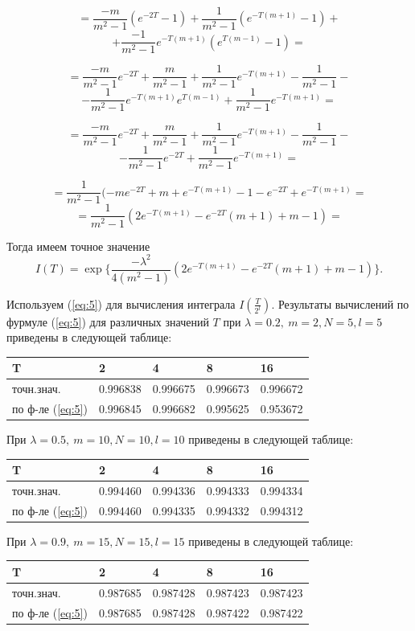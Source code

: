 \documentclass [12pt]{report}
\begin{document}
$$
= \frac{-m}{m^2-1} (e^{-2T} - 1) +
\frac{1}{m^2-1} ( e^{-T(m+1)} - 1) +
$$
$$
+ \frac{-1}{m^2-1} e^{-T(m+1)} (e^{T(m-1)} - 1) =
$$

$$
= \frac{-m}{m^2-1} e^{-2T} + \frac{m}{m^2-1} +
\frac{1}{m^2-1} e^{-T(m+1)} - \frac{1}{m^2-1} -
$$
$$
- \frac{1}{m^2-1} e^{-T(m+1)} e^{T(m-1)} + \frac{1}{m^2-1} e^{-T(m+1)} =
$$

$$
= \frac{-m}{m^2-1} e^{-2T} + \frac{m}{m^2-1} +
\frac{1}{m^2-1} e^{-T(m+1)} - \frac{1}{m^2-1} -
$$
$$
- \frac{1}{m^2-1} e^{-2T} + \frac{1}{m^2-1} e^{-T(m+1)} =
$$

$$
= \frac{1}{m^2-1}( -m e^{-2T} + m +
e^{-T(m+1)} - 1 - e^{-2T} + e^{-T(m+1)} =
$$
$$
= \frac{1}{m^2-1}( 2e^{-T(m+1)} - e^{-2T} (m + 1) + m - 1) =
$$

\noindent Тогда имеем точное значение
$$
I(T) = \exp\{ \frac{- \lambda^2}{4(m^2-1)}
( 2e^{-T(m+1)} - e^{-2T} (m + 1) + m - 1) \}.
$$

\vspace{1cm}

Используем (\ref{eq:5}) для вычисления интеграла $I(\frac{T}{2^l})$.
Результаты вычислений по фурмуле (\ref{eq:5}) для
различных значений $T$ при $\lambda=0.2,~m=2, N=5, l=5$
приведены в следующей таблице:

\begin{center}
\begin{tabular}{ | m{3cm} | m{2cm}| m{2cm} | m{2cm} | m{2cm} | }
\hline
 T & 2 & 4 & 8 & 16 \\
\hline
 точн.знач. & 0.996838 & 0.996675 & 0.996673 & 0.996672 \\
 по ф-ле (\ref{eq:5}) & 0.996845 & 0.996682 & 0.995625 & 0.953672 \\
\hline
\end{tabular}
\end{center}

\noindent При $\lambda=0.5,~m=10, N=10, l=10$
приведены в следующей таблице:
\begin{center}
\begin{tabular}{ | m{3cm} | m{2cm}| m{2cm} | m{2cm} | m{2cm} | }
\hline
 T & 2 & 4 & 8 & 16 \\
\hline
 точн.знач. & 0.994460 & 0.994336 & 0.994333 & 0.994334 \\
 по ф-ле (\ref{eq:5}) & 0.994460 & 0.994335 & 0.994332 & 0.994312 \\
\hline
\end{tabular}
\end{center}

\noindent При $\lambda=0.9,~m=15, N=15, l=15$
приведены в следующей таблице:
\begin{center}
\begin{tabular}{ | m{3cm} | m{2cm}| m{2cm} | m{2cm} | m{2cm} | }
\hline
 T & 2 & 4 & 8 & 16 \\
\hline
 точн.знач. & 0.987685 & 0.987428 & 0.987423 & 0.987423 \\
 по ф-ле (\ref{eq:5}) & 0.987685 & 0.987428 & 0.987422 & 0.987422 \\
\hline
\end{tabular}
\end{center}
\end{document}
